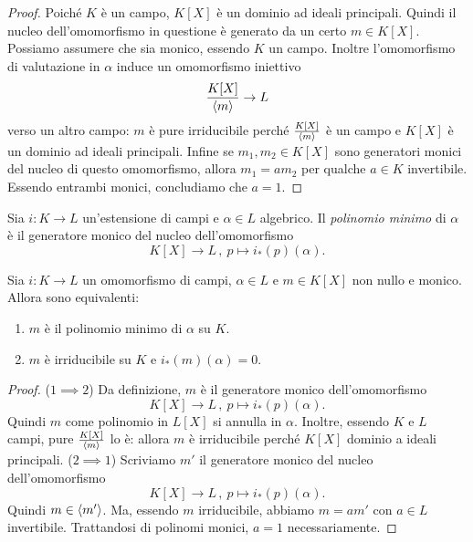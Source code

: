 \begin{proof}
Poiché \(K\) è un campo, \(K[X]\) è un dominio ad ideali principali. Quindi il nucleo dell'omomorfismo in questione è generato da un certo \(m \in K[X]\). Possiamo assumere che sia monico, essendo \(K\) un campo. Inoltre l'omomorfismo di valutazione in \(\alpha\) induce un omomorfismo iniettivo
\[\frac{K[X]}{\left\langle m\right\rangle} \to L\]
verso un altro campo: \(m\) è pure irriducibile perché \(\frac{K[X]}{\left\langle m\right\rangle}\) è un campo e \(K[X]\) è un dominio ad ideali principali. Infine se \(m_1, m_2 \in K[X]\) sono generatori monici del nucleo di questo omomorfismo, allora \(m_1 = a m_2\) per qualche \(a \in K\) invertibile. Essendo entrambi monici, concludiamo che \(a = 1\).
\end{proof}

\begin{defi}
Sia \(i : K \to L\) un'estensione di campi e \(\alpha \in L\) algebrico. Il {\em polinomio minimo} di \(\alpha\) è il generatore monico del nucleo dell'omomorfismo
\[K[X] \to L\,,\ p \mapsto i_\ast(p)(\alpha) .\]
\end{defi}

\begin{prop}\label{prop:EquivalentiPolinomioMinimo}
Sia \(i : K \to L\) un omomorfismo di campi, \(\alpha \in L\) e \(m \in K[X]\) non nullo e monico. Allora sono equivalenti:
\begin{enumerate}
\item \(m\) è il polinomio minimo di \(\alpha\) su \(K\).
\item \(m\) è irriducibile su \(K\) e \(i_\ast (m)(\alpha) = 0\).
\end{enumerate}
\end{prop}

\begin{proof}
(\(1 \implies 2\)) Da definizione, \(m\) è il generatore monico dell'omomorfismo
\[K[X] \to L\,,\ p \mapsto i_\ast (p)(\alpha) .\]
Quindi \(m\) come polinomio in \(L[X]\) si annulla in \(\alpha\). Inoltre, essendo \(K\) e \(L\) campi, pure \(\frac{K[X]}{\left\langle m\right\rangle}\) lo è: allora \(m\) è irriducibile perché \(K[X]\) dominio a ideali principali.\newline
(\(2 \implies 1\)) Scriviamo \(m'\) il generatore monico del nucleo dell'omomorfismo
\[K[X] \to L\,,\ p \mapsto i_\ast (p) (\alpha) .\]
Quindi \(m \in \left\langle m'\right\rangle\). Ma, essendo \(m\) irriducibile, abbiamo \(m = a m'\) con \(a \in L\) invertibile. Trattandosi di polinomi monici, \(a = 1\) necessariamente.
\end{proof}


